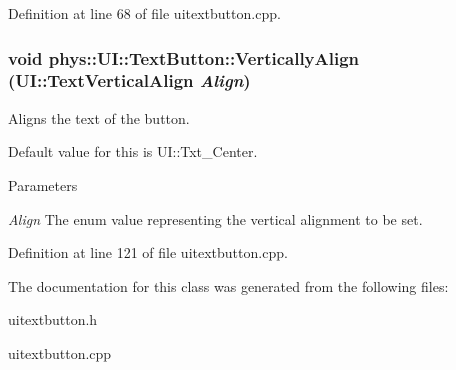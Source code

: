 Definition at line 68 of file uitextbutton.cpp.

\hypertarget{classphys_1_1UI_1_1TextButton_a7319f855026794c9c42f292093d1351f}{
\subsubsection[{VerticallyAlign}]{\setlength{\rightskip}{0pt plus 5cm}void phys::UI::TextButton::VerticallyAlign (UI::TextVerticalAlign {\em Align})}}
\label{df/d03/classphys_1_1UI_1_1TextButton_a7319f855026794c9c42f292093d1351f}


Aligns the text of the button. 

Default value for this is UI::Txt\_\-Center. 
\begin{DoxyParams}{Parameters}
\item[{\em Align}]The enum value representing the vertical alignment to be set. \end{DoxyParams}


Definition at line 121 of file uitextbutton.cpp.



The documentation for this class was generated from the following files:\begin{DoxyCompactItemize}
\item 
uitextbutton.h\item 
uitextbutton.cpp\end{DoxyCompactItemize}

